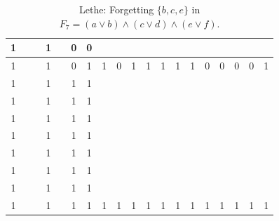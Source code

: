 \begin{table}[!tb]
\begin{tabular}{|c|c|c|c|c|c|c|c|c|c|c|c|c|c|c|c|c|c|c|}
        \rowcolor{blue!40} 1 &  &  & 1 &  & 0 & 0 &  &  &  &  &  &  &  &  &  &  &  &  \\ \hline
        \rowcolor{blue!40} 1 &  &  & 1 &  & 0 & 1 & 1 & 0 & 1 & 1 & 1 & 1 & 1 & 0 & 0 & 0 & 0 & 1 \\ \hline
        \rowcolor{red!40} 1 &  &  & 1 &  & 1 & 1 &  &  &  &  &  &  &  &  &  &  &  &  \\ \hline
        \rowcolor{red!40} 1 &  &  & 1 &  & 1 & 1 &  &  &  &  &  &  &  &  &  &  &  &  \\ \hline
        \rowcolor{red!40} 1 &  &  & 1 &  & 1 & 1 &  &  &  &  &  &  &  &  &  &  &  &  \\ \hline
        \rowcolor{red!40} 1 &  &  & 1 &  & 1 & 1 &  &  &  &  &  &  &  &  &  &  &  &  \\ \hline
        \rowcolor{red!40} 1 &  &  & 1 &  & 1 & 1 &  &  &  &  &  &  &  &  &  &  &  &  \\ \hline
        \rowcolor{red!40} 1 &  &  & 1 &  & 1 & 1 &  &  &  &  &  &  &  &  &  &  &  &  \\ \hline
        \rowcolor{red!40} 1 &  &  & 1 &  & 1 & 1 &  &  &  &  &  &  &  &  &  &  &  &  \\ \hline
        \rowcolor{red!40} 1 &  &  & 1 &  & 1 & 1 & 1 & 1 & 1 & 1 & 1 & 1 & 1 & 1 & 1 & 1 & 1 & 1 \\ \hline
    \end{tabular}
    \caption{Lethe: Forgetting $\{b, c, e\}$ in $F_{7} = (a \lor b) \land (c \lor d) \land (e \lor f)$.}
    \label{tab:lethe-F7-bce}
\end{table}
